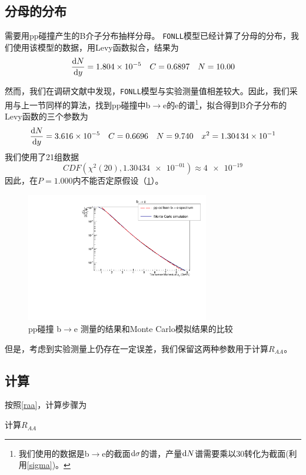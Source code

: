 \documentclass[12pt, a4paper]{ctexart}
\begin{document}
\subsection{分母的分布} %
\label{sub:分母的分布}
需要用pp碰撞产生的B介子分布抽样分母。
\texttt{FONLL}模型\cite{cacciari2012theoretical}已经计算了分母的分布，我们使用该模型的数据，用Levy函数拟合，结果为
\begin{equation}\label{sigma}
	\frac{\mathrm{d} N}{\mathrm{d} y} = \num{1.804e-05}\quad C = \num{0.6897}\quad N = \num{10.00}
\end{equation}
\par
然而，我们在调研文献中发现，\texttt{FONLL}模型与实验测量值\cite{Aidala:2019hib}相差较大。因此，我们采用与上一节同样的算法，找到pp碰撞中b$\to$e的e的谱\footnote{我们使用的数据是b$\to$e的截面$\mathrm{d} \sigma$的谱，产量$\mathrm{d} N$谱需要乘以30转化为截面(利用\cref{sigma})。}，拟合得到B介子分布的Levy函数的三个参数为
\begin{equation}
	\frac{\mathrm{d} N}{\mathrm{d} y} = \num{3.616e-05}\quad C = \num{0.6696}\quad N = \num{9.740}\quad x^2=\num{1.30434e-01} 
\end{equation}
我们使用了21组数据
\begin{equation}
	CDF(\chi^2(20),\num{1.30434e-01})\approx\num{4e-19}
\end{equation}
因此，在$P=1.000$内不能否定原假设（\cref{b2ep}）。
\begin{figure}[h]\centering
	\includegraphics[width=8cm]{figures/pp.pdf}
	\caption{pp碰撞 b$\to$e 测量的结果和Monte Carlo模拟结果的比较}
	\label{b2ep}
\end{figure}
但是，考虑到实验测量上仍存在一定误差，我们保留这两种参数用于计算$R_{AA}$。

\subsection{计算} %
\label{sub:计算}
按照\cref{raa}，计算步骤为
\begin{algorithm}[htb]
  \small
  \caption{计算$R_{AA}$}
  \label{algo:algorithm1}
\end{algorithm}
\end{document}
